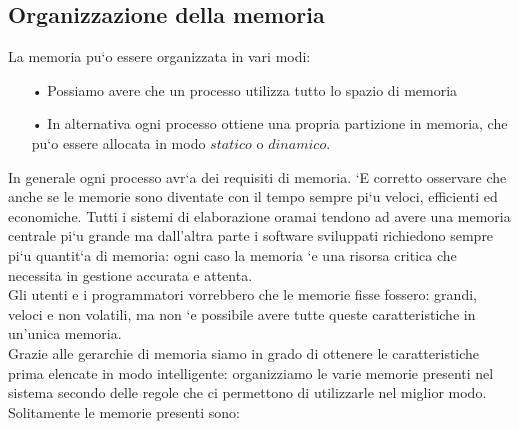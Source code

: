 \documentclass{article}
\begin{document}
\subsection{Organizzazione della memoria}
La memoria pu`o essere organizzata in vari modi:
\begin{enumerate}
   \item[•] Possiamo avere che un processo utilizza tutto lo spazio di memoria
   \item[•] In alternativa ogni processo ottiene una propria partizione in memoria, che pu`o essere allocata in modo $statico$ o $dinamico$.
\end{enumerate}
In generale ogni processo avr`a dei requisiti di memoria. `E corretto osservare
che anche se le memorie sono diventate con il tempo sempre pi`u veloci, efficienti
ed economiche. Tutti i sistemi di elaborazione oramai tendono ad avere una
memoria centrale pi`u grande ma dall’altra parte i software sviluppati richiedono
sempre pi`u quantit`a di memoria: ogni caso la memoria `e una risorsa critica
che necessita in gestione accurata e attenta.
\\Gli utenti e i programmatori vorrebbero che le memorie fisse fossero: grandi,
veloci e non volatili, ma non `e possibile avere tutte queste caratteristiche in
un’unica memoria.
\\Grazie alle gerarchie di memoria siamo in grado di ottenere le caratteristiche
prima elencate in modo intelligente: organizziamo le varie memorie presenti nel
sistema secondo delle regole che ci permettono di utilizzarle nel miglior modo.
\\Solitamente le memorie presenti sono:
\end{document}
